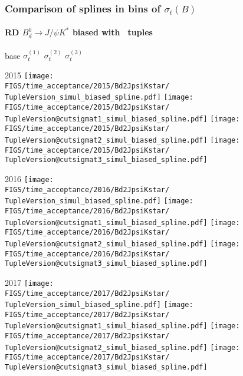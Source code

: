 \begin{frame} %
\frametitle{Comparison of splines in bins of $\sigma_t(B)$}
\framesubtitle{RD $B_d^0\rightarrow J/\psi K^*$ biased with \TupleVersion\, tuples}

  \phantom{2020} base \hspace*{1.5cm} $\sigma_t^{(1)}$ \hspace*{1.5cm} $\sigma_t^{(2)}$ \hspace*{1.5cm} $\sigma_t^{(3)}$

  2015
  \texttt{[image: \\FIGS/time\_acceptance/2015/Bd2JpsiKstar/\\TupleVersion\_simul\_biased\_spline.pdf]}
  \texttt{[image: \\FIGS/time\_acceptance/2015/Bd2JpsiKstar/\\TupleVersion@cutsigmat1\_simul\_biased\_spline.pdf]}
  \texttt{[image: \\FIGS/time\_acceptance/2015/Bd2JpsiKstar/\\TupleVersion@cutsigmat2\_simul\_biased\_spline.pdf]}
  \texttt{[image: \\FIGS/time\_acceptance/2015/Bd2JpsiKstar/\\TupleVersion@cutsigmat3\_simul\_biased\_spline.pdf]}
  \vspace*{2mm}

  2016
  \texttt{[image: \\FIGS/time\_acceptance/2016/Bd2JpsiKstar/\\TupleVersion\_simul\_biased\_spline.pdf]}
  \texttt{[image: \\FIGS/time\_acceptance/2016/Bd2JpsiKstar/\\TupleVersion@cutsigmat1\_simul\_biased\_spline.pdf]}
  \texttt{[image: \\FIGS/time\_acceptance/2016/Bd2JpsiKstar/\\TupleVersion@cutsigmat2\_simul\_biased\_spline.pdf]}
  \texttt{[image: \\FIGS/time\_acceptance/2016/Bd2JpsiKstar/\\TupleVersion@cutsigmat3\_simul\_biased\_spline.pdf]}
  \vspace*{2mm}

  2017
  \texttt{[image: \\FIGS/time\_acceptance/2017/Bd2JpsiKstar/\\TupleVersion\_simul\_biased\_spline.pdf]}
  \texttt{[image: \\FIGS/time\_acceptance/2017/Bd2JpsiKstar/\\TupleVersion@cutsigmat1\_simul\_biased\_spline.pdf]}
  \texttt{[image: \\FIGS/time\_acceptance/2017/Bd2JpsiKstar/\\TupleVersion@cutsigmat2\_simul\_biased\_spline.pdf]}
  \texttt{[image: \\FIGS/time\_acceptance/2017/Bd2JpsiKstar/\\TupleVersion@cutsigmat3\_simul\_biased\_spline.pdf]}
  \vspace*{2mm}


\end{frame}
